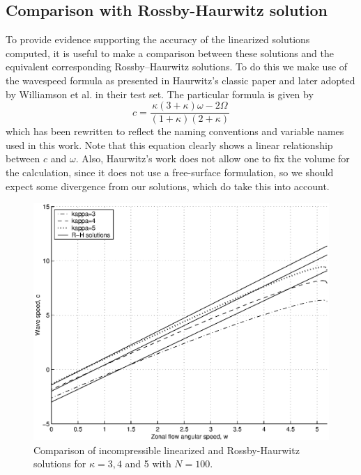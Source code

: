 \subsection{Comparison with Rossby-Haurwitz solution}
\label{subsec:rhandlincomp}
To provide evidence supporting the accuracy of the linearized solutions computed, it is useful to make a comparison between these solutions and the equivalent corresponding Rossby--Haurwitz solutions. To do this we make use of the wavespeed formula as presented in Haurwitz's classic paper \cite{Haurwitz:MAD} and later adopted by Williamson et al. in their test set. The particular formula is given by
\begin{equation}
c=\frac{\kappa(3+\kappa)\omega-2\Omega}{(1+\kappa)(2+\kappa)}
\end{equation}
which has been rewritten to reflect the naming conventions and variable names used in this work. Note that this equation clearly shows a linear relationship between $c$ and $\omega$. Also, Haurwitz's work does not allow one to fix the volume for the calculation, since it does not use a free-surface formulation, so we should expect some divergence from our solutions, which do take this into account.
\begin{figure}[htbp]
	\centering
		\includegraphics[scale=0.7]{IMAGES/wvchconst1.eps}
	\caption{Comparison of incompressible linearized and Rossby-Haurwitz solutions for $\kappa=3,4$ and 5 with $N=100$.}
	\label{fig:wvcincomp}
\end{figure}

